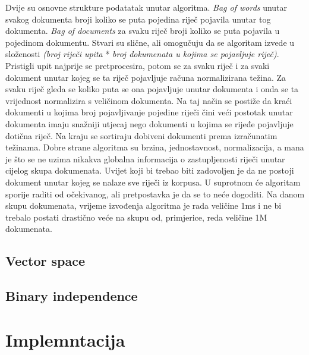\documentclass[a4paper,12pt]{article}
\begin{document}
Dvije su osnovne strukture podatatak unutar algoritma. \textit{Bag of words} unutar svakog dokumenta broji koliko se puta pojedina riječ pojavila unutar tog dokumenta. \textit{Bag of documents} za svaku riječ broji koliko se puta pojavila u pojedinom dokumentu. Stvari su slične, ali omogučuju da se algoritam izvede u složenosti \textit{(broj riječi upita} * \textit{broj dokumenata u kojima se pojavljuje riječ)}. Pristigli upit najprije se pretprocesira, potom se za svaku riječ i za svaki dokument unutar kojeg se ta riječ pojavljuje računa normalizirana težina. Za svaku riječ  gleda se koliko puta se ona pojavljuje unutar dokumenta i onda se ta vrijednost normalizira s veličinom dokumenta. Na taj način se postiže da kraći dokumenti u kojima broj pojavljivanje pojedine riječi čini veći postotak unutar dokumenta imaju snažniji utjecaj nego dokumenti u kojima se rijeđe pojavljuje dotična riječ. Na kraju se sortiraju dobiveni dokumenti prema izračunatim težinama. Dobre strane algoritma su brzina, jednostavnost, normalizacija, a mana je što se ne uzima nikakva globalna informacija o zastupljenosti riječi unutar cijelog skupa dokumenata. Uvijet koji bi trebao biti zadovoljen je da ne postoji dokument unutar kojeg se nalaze sve riječi iz korpusa. U suprotnom će algoritam sporije raditi od očekivanog, ali pretpostavka je da se to neće dogoditi. Na danom skupu dokumenata, vrijeme izvođenja algoritma je rada veličine 1ms i ne bi trebalo postati drastično veće na skupu od, primjerice, reda veličine 1M dokumenata.

\subsection{Vector space}

\subsection{Binary independence}

\section{Implemntacija}
\end{document}
